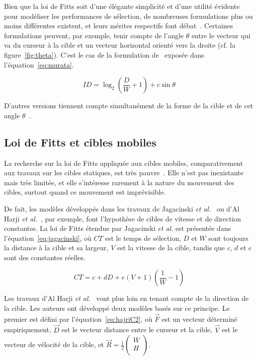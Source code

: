 	Bien que la loi de Fitts soit d'une élégante simplicité et d'une utilité évidente pour modéliser les performances de sélection, de nombreuses formulations plus ou moins différentes existent, et leurs mérites respectifs font débat~\cite{casallas2015prediction}. Certaines formulations peuvent, par exemple, tenir compte de l'angle $\theta$ entre le vecteur qui va du curseur à la cible et un vecteur horizontal orienté vers la droite (cf. la figure~\ref{fig:theta}). C'est le cas de la formulation de~\cite{murata2001extending} exposée dans l'équation~\ref{eq:murata}.
	
	\begin{equation}
		\label{eq:murata}
		ID = \log_2\left(\frac{D}{W} + 1\right) + c \sin \theta
	\end{equation}
	
	D'autres versions tiennent compte simultanément de la forme de la cible et de cet angle $\theta$~\cite{appert2008evaluation, grossman2004pointing}.
	
	\subsection{Loi de Fitts et cibles mobiles}
	La recherche sur la loi de Fitts appliquée aux cibles mobiles, comparativement aux travaux sur les cibles statiques, est très pauvre~\cite{casallas2015prediction}. Elle n'est pas inexistante~\cite{jagacinski1980test, hoffmann1991capture, hajri2011moving} mais très limitée, et elle s'intéresse rarement à la nature du mouvement des cibles, surtout quand ce mouvement est imprévisible.
	
	De fait, les modèles développés dans les travaux de Jagacinski \emph{et al.}~\cite{jagacinski1980test} ou d'Al Harji \emph{et al.}~\cite{hajri2011moving}, par exemple, font l'hypothèse de cibles de vitesse et de direction constantes. La loi de Fitts étendue par Jagacinski \emph{et al.} est présentée dans l'équation~\ref{eq:jagacinski}, où $CT$ est le temps de sélection, $D$ et $W$ sont toujours la distance à la cible et sa largeur, $V$ est la vitesse de la cible, tandis que $c$, $d$ et $e$ sont des constantes réelles.
	
	\begin{equation}
		\label{eq:jagacinski}
		CT = c + dD + e(V + 1) \left(\frac{1}{W} - 1\right)
	\end{equation}
	
	Les travaux d'Al Harji \emph{et al.}~\cite{hajri2011moving} vont plus loin en tenant compte de la direction de la cible. Les auteurs ont développé deux modèles basés sur ce principe. Le premier est défini par l'équation~\ref{eq:hajriC2}, où $\vec{F}$ est un vecteur déterminé empiriquement, $\vec{D}$ est le vecteur distance entre le curseur et la cible, $\vec{V}$ est le vecteur de vélocité de la cible, et $\vec{R} = \frac{1}{2} \begin{pmatrix}
	W \\ H \\
	\end{pmatrix}$.
	
